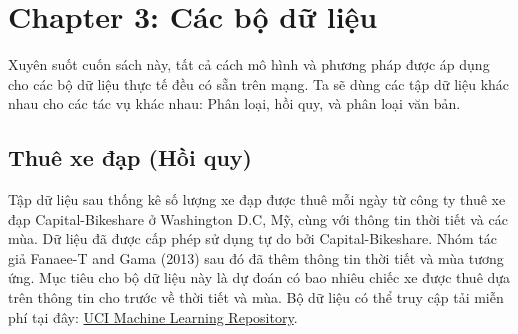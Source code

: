 \usepackage{import}


\chapter*{Chapter 3: Các bộ dữ liệu}

Xuyên suốt cuốn sách này, tất cả cách mô hình và phương pháp được áp dụng cho các bộ dữ liệu thực tế đều có sẵn trên mạng. Ta sẽ dùng các tập dữ liệu khác nhau cho các tác vụ khác nhau: Phân loại, hồi quy, và phân loại văn bản.

\section{Thuê xe đạp (Hồi quy)}\label{chap_3.1}
Tập dữ liệu sau thống kê số lượng xe đạp được thuê mỗi ngày từ công ty thuê xe đạp Capital-Bikeshare ở Washington D.C, Mỹ, cùng với thông tin thời tiết và các mùa. Dữ liệu đã được cấp phép sử dụng tự do bởi Capital-Bikeshare. Nhóm tác giả Fanaee-T and Gama (2013) sau đó đã thêm thông tin thời tiết và mùa tương ứng. Mục tiêu cho bộ dữ liệu này là dự đoán có bao nhiêu chiếc xe được thuê dựa trên thông tin cho trước về thời tiết và mùa. Bộ dữ liệu có thể truy cập tải miễn phí tại đây: \href{http://archive.ics.uci.edu/ml/datasets/Bike+Sharing+Dataset}{UCI Machine Learning Repository}. 

